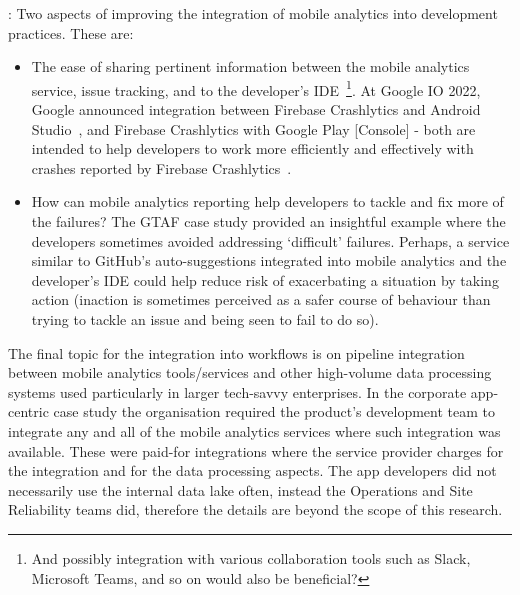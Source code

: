 \textbf{\itools}: 
Two aspects of improving the integration of mobile analytics into development practices. These are:
\begin{itemize}
    \itemsep0em
    \item The ease of sharing pertinent information between the mobile analytics service, issue tracking, and to the developer's IDE~\footnote{And possibly integration with various collaboration tools such as Slack, Microsoft Teams, and so on would also be beneficial?}. At Google IO 2022, Google announced integration between Firebase Crashlytics and Android Studio~\citep{android2022_firebase_crash_integration_into_android_studio_electric_eel}, and Firebase Crashlytics with Google Play [Console] - both are intended to help developers to work more efficiently and effectively with crashes reported by Firebase Crashlytics~\citep{firebaseblog2022_whats_new_at_google_io}. 
    \item How can mobile analytics reporting help developers to tackle and fix more of the failures? The GTAF case study provided an insightful example where the developers sometimes avoided addressing `difficult' failures. Perhaps, a service similar to GitHub's auto-suggestions integrated into mobile analytics and the developer's IDE could help reduce risk of exacerbating a situation by taking action (inaction is sometimes perceived as a safer course of behaviour than trying to tackle an issue and being seen to fail to do so).  
\end{itemize}

The final topic for the integration into workflows is on pipeline integration between mobile analytics tools/services and other high-volume data processing systems used particularly in larger tech-savvy enterprises. In the corporate app-centric case study the organisation required the product's development team to integrate any and all of the mobile analytics services where such integration was available. These were paid-for integrations where the service provider charges for the integration and for the data processing aspects. The app developers did not necessarily use the internal data lake often, instead the Operations and Site Reliability teams did, therefore the details are beyond the scope of this research.


